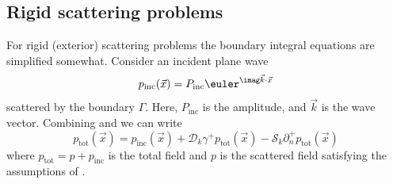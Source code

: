 \subsection{Rigid scattering problems}
For rigid (exterior) scattering problems the boundary integral equations are simplified somewhat. Consider an incident plane wave
\begin{equation*}
	p_{\mathrm{inc}}(\vec{x}) = P_{\mathrm{inc}}\euler^{\imag \vec{k}\cdot\vec{x}}
\end{equation*}
scattered by the boundary $\Gamma$. Here, $P_{\mathrm{inc}}$ is the amplitude, and $\vec{k}$ is the wave vector. Combining  and  we can write
\begin{equation*}
	p_{\mathrm{tot}}(\vec{x}) = p_{\mathrm{inc}}(\vec{x}) +\mathcal{D}_k\gamma^+ p_{\mathrm{tot}}(\vec{x}) - \mathcal{S}_k\partial_n^+ p_{\mathrm{tot}}(\vec{x})
\end{equation*}
where $p_{\mathrm{tot}}=p+p_{\mathrm{inc}}$ is the total field and $p$ is the scattered field satisfying the assumptions of . 

